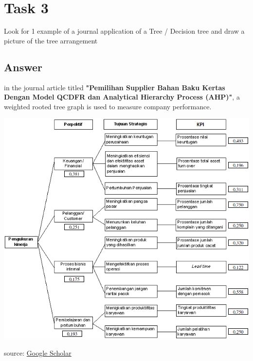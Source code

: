 \documentclass[12pt,titlepage]{article}
\begin{document}
\newpage

\section*{Task 3}
Look for 1 example of a journal application of a Tree / Decision tree and draw a picture of the tree arrangement 

\subsection*{Answer}
in the journal article titled \textbf{"Pemilihan Supplier Bahan Baku Kertas Dengan Model QCDFR dan Analytical Hierarchy Process (AHP)"}, a weighted rooted tree graph is used to measure company performance. 

\includegraphics[width=.9\textwidth]{images/figures/fig11.png}

source: %
\href{https://scholar.google.com/citations?view_op=view_citation&hl=id&user=RWuenBkAAAAJ&cstart=20&pagesize=80&authuser=1&citation_for_view=RWuenBkAAAAJ:UeHWp8X0CEIC}{Google Scholar}
\end{document}
